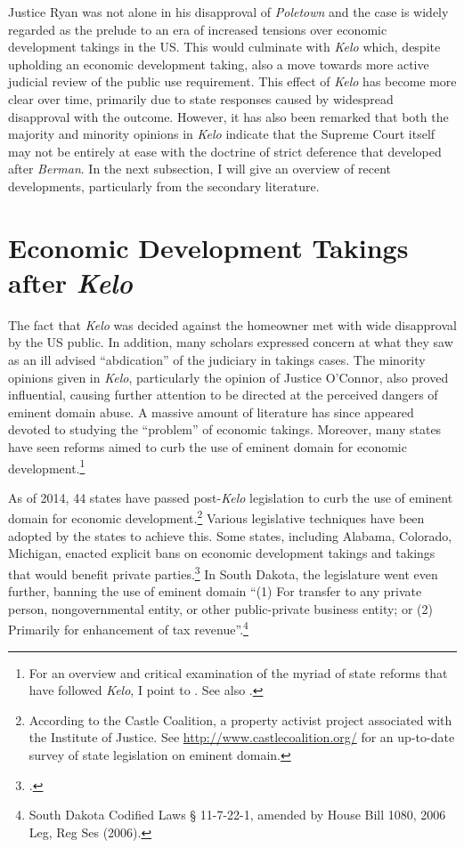 Justice Ryan was not alone in his disapproval of {\it Poletown} and the case is widely regarded as the prelude to an era of increased tensions over economic development takings in the US. This would culminate with {\it Kelo} which, despite upholding an economic development taking, also  a move towards more active judicial review of the public use requirement. This effect of {\it Kelo} has become more clear over time, primarily due to state responses caused by widespread disapproval with the outcome. However, it has also been remarked that both the majority and minority opinions in {\it Kelo} indicate that the Supreme Court itself may not be entirely at ease with the doctrine of strict deference that developed after {\it Berman}. In the next subsection, I will give an overview of recent developments, particularly from the secondary literature.

\section{Economic Development Takings after {\it Kelo}}\label{sec:postkelo}

The fact that {\it Kelo} was decided against the homeowner met with wide disapproval by the US public. In addition, many scholars expressed concern at what they saw as an ill advised ``abdication'' of the judiciary in takings cases. The minority opinions given in {\it Kelo}, particularly the opinion of Justice O'Connor, also proved influential, causing further attention to be directed at the perceived dangers of eminent domain abuse. A massive amount of literature has since appeared devoted to studying the ``problem'' of economic takings. Moreover,  many states have seen reforms aimed to curb the use of eminent domain for economic development.\footnote{For an overview and critical examination of the myriad of state reforms that have followed {\it Kelo}, I point to \cite{eagle08}. See also \cite{somin09}.} 

As of 2014, 44 states have passed post-{\it Kelo} legislation to curb the use of eminent domain for economic development.\footnote{According to the Castle Coalition, a property activist project associated with the Institute of Justice. See \url{http://www.castlecoalition.org/} for an up-to-date survey of state legislation on eminent domain.} Various legislative techniques have been adopted by the states to achieve this. Some states, including Alabama, Colorado, Michigan, enacted explicit bans on economic development takings and takings that would benefit private parties.\footcite[See][107-108]{eagle08} In South Dakota, the legislature went even further, banning the use of eminent domain  ``(1) For transfer to any private person, nongovernmental entity, or other public-private business entity; or (2) Primarily for enhancement of tax revenue''.\footnote{South Dakota Codified Laws § 11-7-22-1, amended by House Bill 1080, 2006 Leg, Reg Ses (2006).}

